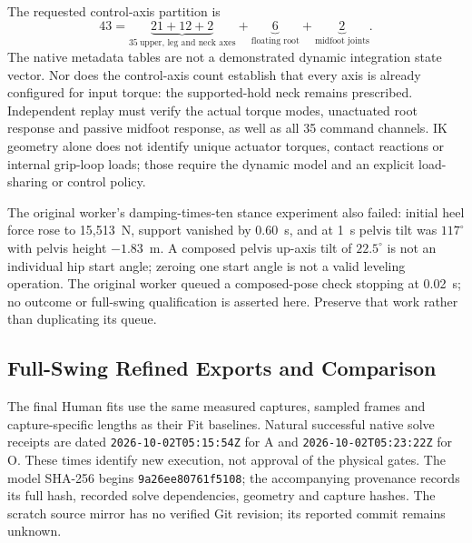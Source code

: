 \documentclass[11pt,a4paper]{article}
\begin{document}
The requested control-axis partition is
\[
 43 = \underbrace{21+12+2}_{35\ \text{upper, leg and neck axes}}
       +\underbrace{6}_{\text{floating root}}
       +\underbrace{2}_{\text{midfoot joints}}.
\]
The native metadata tables are not a demonstrated dynamic integration
state vector. Nor does the control-axis count establish that every axis is
already configured for input torque: the supported-hold neck remains
prescribed. Independent replay must verify the actual torque modes,
unactuated root response and passive midfoot response, as well as all 35
command channels. IK geometry alone does not identify unique actuator
torques, contact reactions or internal grip-loop loads; those require the
dynamic model and an explicit load-sharing or control policy.

The original worker's damping-times-ten stance experiment also failed:
initial heel force rose to 15,513~N, support vanished by 0.60~s, and at 1~s
pelvis tilt was $117^\circ$ with pelvis height $-1.83$~m. A composed pelvis
up-axis tilt of $22.5^\circ$ is not an individual hip start angle; zeroing
one start angle is not a valid leveling operation. The original worker queued
a composed-pose check stopping at 0.02~s; no outcome or full-swing qualification
is asserted here. Preserve that work rather than duplicating its queue.

\subsection{Full-Swing Refined Exports and Comparison}
The final Human fits use the same measured captures, sampled frames and
capture-specific lengths as their Fit baselines. Natural successful native
solve receipts are dated \texttt{2026-10-02T05:15:54Z} for A and
\texttt{2026-10-02T05:23:22Z} for O. These times identify new execution,
not approval of the physical gates. The model SHA-256 begins
\texttt{9a26ee80761f5108}; the accompanying provenance records its full hash,
recorded solve dependencies, geometry and capture hashes. The scratch source
mirror has no verified Git revision; its reported commit remains unknown.
\end{document}
